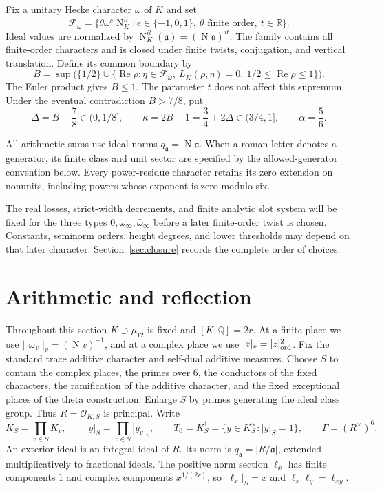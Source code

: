 \documentclass[11pt,a4paper]{article}
\numberwithin{equation}{section}
\theoremstyle{definition}
\theoremstyle{remark}
\newcommand{\RR}{\mathbb R}
\newcommand{\Rea}{\operatorname{Re}}
\newcommand{\Norm}{\operatorname{N}}
\newcommand{\cF}{\mathcal F}
\begin{document}
Fix a unitary Hecke character $\omega$ of $K$ and set
\begin{equation}\label{eq:family}
 \cF_\omega=
 \{\theta\omega^e\Norm_K^{it}: e\in\{-1,0,1\},\
       \theta\text{ finite order},\ t\in\RR\}.
\end{equation}
Ideal values are normalized by
$\Norm_K^{it}(\mathfrak a)=(\Norm\mathfrak a)^{it}$.
The family contains all finite-order characters and is closed under finite
twists, conjugation, and vertical translation.  Define its common boundary by
\begin{equation}\label{eq:common-boundary}
 B=\sup\bigl(\{1/2\}\cup
  \{\Rea\rho:\eta\in\cF_\omega,\ L_K(\rho,\eta)=0,
                         \ 1/2\leq\Rea\rho\leq1\}\bigr).
\end{equation}
The Euler product gives $B\leq1$.  The parameter $t$ does not affect
this supremum.  Under the eventual contradiction $B>7/8$, put
\begin{equation}\label{eq:dynamic}
 \Delta=B-\frac78\in(0,1/8],\qquad
 \kappa=2B-1=\frac34+2\Delta\in(3/4,1],\qquad
 \alpha=\frac56.
\end{equation}

All arithmetic sums use ideal norms $q_{\mathfrak a}=\Norm\mathfrak a$.
When a roman letter denotes a generator, its finite class and unit sector
are specified by the allowed-generator convention below.  
Every power-residue character retains its zero extension on nonunits,
including powers whose exponent is zero modulo six.

The real losses, strict-width decrements, and finite analytic slot system
will be fixed for the three types $0,\omega_\infty,\bar\omega_\infty$
before a later finite-order twist is chosen.  Constants, seminorm orders,
height degrees, and lower thresholds may depend on that later character.
Section~\ref{sec:closure} records the complete order of choices.

\section{Arithmetic and reflection}
\label{sec:transfer}

Throughout this section $K\supset\mu_{12}$ is fixed and
$[K:\mathbb Q]=2r$.  At a finite place we use
$|\varpi_v|_v=(\operatorname N v)^{-1}$, and at a complex place we use
$|z|_v=|z|_{\rm ord}^2$.  Fix the standard trace additive character and
self-dual additive measures.  Choose $S$ to contain the complex places,
the primes over $6$, the conductors of the fixed characters, the
ramification of the additive character, and the fixed exceptional places
of the theta construction.  Enlarge $S$ by primes generating the ideal
class group.  Thus $R=\mathcal O_{K,S}$ is principal.  Write
\[
 K_S=\prod_{v\in S}K_v,\qquad
 |y|_S=\prod_{v\in S}|y_v|_v,\qquad
 T_0=K_S^1=\{y\in K_S^\times:|y|_S=1\},\qquad
 \Gamma=(R^\times)^6.
\]
An exterior ideal is an integral ideal of $R$.  Its norm is
$q_{\mathfrak a}=|R/\mathfrak a|$, extended multiplicatively to fractional
ideals.  The positive norm section $\ell_x$ has
finite components $1$ and complex components $x^{1/(2r)}$, so
$|\ell_x|_S=x$ and $\ell_x\ell_y=\ell_{xy}$.
\end{document}
